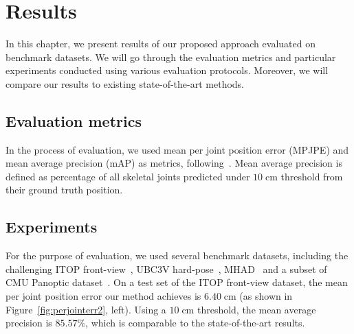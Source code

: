 \chapter{Results}\label{chap:results}

In this chapter, we present results of our proposed approach evaluated on benchmark datasets. We will go through the evaluation metrics and particular experiments conducted using various evaluation protocols. Moreover, we will compare our results to existing state-of-the-art methods.\par

\section{Evaluation metrics}
In the process of evaluation, we used mean per joint position error (MPJPE) and mean average precision (mAP) as metrics, following~\cite{Ali19,haque2016viewpoint,Marin18jvcir,Shafaei16}. Mean average precision is defined as percentage of all skeletal joints predicted under $10 \; \mbox{cm}$ threshold from their ground truth position.\par

\section{Experiments}


For the purpose of evaluation, we used several benchmark datasets, including the challenging ITOP front-view~\cite{haque2016viewpoint}, UBC3V hard-pose~\cite{Shafaei16}, MHAD~\cite{Vidal:2013:BMC:2478277.2478412} and a subset of CMU Panoptic dataset~\cite{Joo_2017_TPAMI}. On a test set of the ITOP front-view dataset, the mean per joint position error our method achieves is $6.40 \; \mbox{cm}$ (as shown in Figure~\ref{fig:perjointerr2}, left). Using a $10 \; \mbox{cm}$ threshold, the mean average precision is $85.57\%$, which is comparable to the state-of-the-art results.\par %
\vspace{5mm}

